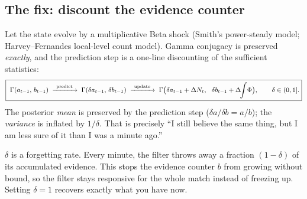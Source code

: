 \documentclass[11pt,a4paper]{article}
\theoremstyle{plain}
\begin{document}
\subsection*{The fix: discount the evidence counter}

Let the state evolve by a multiplicative Beta shock (Smith's power-steady model;
Harvey--Fernandes local-level count model). Gamma conjugacy is preserved \emph{exactly}, and
the prediction step is a one-line discounting of the sufficient statistics:
\begin{equation}
\small
\boxed{\;
  \Gamma(a_{t-1},\,b_{t-1})
  \;\xrightarrow{\ \text{predict}\ }\;
  \Gamma(\delta a_{t-1},\,\delta b_{t-1})
  \;\xrightarrow{\ \text{update}\ }\;
  \Gamma\big(\delta a_{t-1} + \Delta N_t,\ \ \delta b_{t-1} + \Delta\!\!\int\!\Phi\big),
  \qquad \delta\in(0,1].}
\label{eq:discount}
\end{equation}
The posterior \emph{mean} is preserved by the prediction step ($\delta a/\delta b = a/b$); the
\emph{variance} is inflated by $1/\delta$. That is precisely ``I still believe the same thing,
but I am less sure of it than I was a minute ago.''

\begin{plain}
$\delta$ is a forgetting rate. Every minute, the filter throws away a fraction $(1-\delta)$ of
its accumulated evidence. This stops the evidence counter $b$ from growing without bound, so
the filter stays responsive for the whole match instead of freezing up. Setting $\delta=1$
recovers exactly what you have now.
\end{plain}
\end{document}
